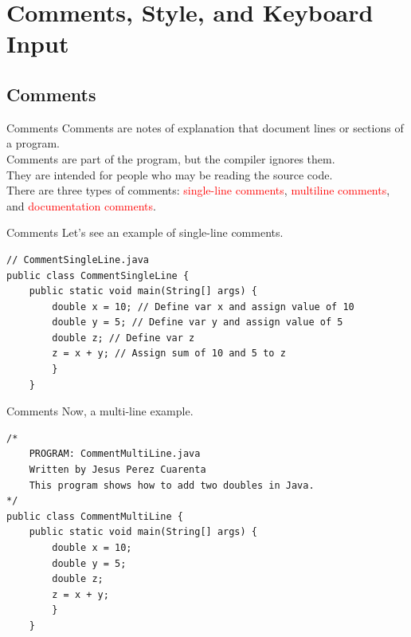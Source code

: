 \documentclass[11pt]{beamer}
\newcommand{\red}[1]{\textcolor{red}{#1}}
\begin{document}
\section{Comments, Style, and Keyboard Input}
\subsection{Comments}
\begin{frame}[fragile]{Comments}
    Comments are notes of explanation that document lines or sections of a program. \\ \vspace{1em}
    Comments are part of the program, but the compiler ignores them. \\ \vspace{1em}
    They are intended for people who may be reading the source code. \\ \vspace{1em}
    There are three types of comments: \red{single-line comments}, \red{multiline comments}, and \red{documentation comments}.
\end{frame}

\begin{frame}[fragile]{Comments}
    Let's see an example of single-line comments.
\begin{lstlisting}
// CommentSingleLine.java
public class CommentSingleLine {
    public static void main(String[] args) {
        double x = 10; // Define var x and assign value of 10
        double y = 5; // Define var y and assign value of 5
        double z; // Define var z
        z = x + y; // Assign sum of 10 and 5 to z
        }
    }
\end{lstlisting}
\end{frame}

\begin{frame}[fragile]{Comments}
    Now, a multi-line example.
\begin{lstlisting}
/*
    PROGRAM: CommentMultiLine.java
    Written by Jesus Perez Cuarenta
    This program shows how to add two doubles in Java.
*/
public class CommentMultiLine {
    public static void main(String[] args) {
        double x = 10;
        double y = 5;
        double z;
        z = x + y;
        }
    }
\end{lstlisting}
\end{frame}
\end{document}

